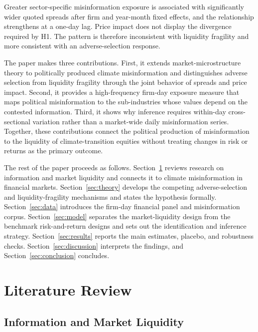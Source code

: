 \documentclass{article}
\theoremstyle{plain}
\begin{document}
Greater sector-specific misinformation exposure is associated with significantly wider quoted spreads after firm and year-month fixed effects, and the relationship strengthens at a one-day lag. Price impact does not display the divergence required by H1. The pattern is therefore inconsistent with liquidity fragility and more consistent with an adverse-selection response.

The paper makes three contributions. First, it extends market-microstructure theory to politically produced climate misinformation and distinguishes adverse selection from liquidity fragility through the joint behavior of spreads and price impact. Second, it provides a high-frequency firm-day exposure measure that maps political misinformation to the sub-industries whose values depend on the contested information. Third, it shows why inference requires within-day cross-sectional variation rather than a market-wide daily misinformation series. Together, these contributions connect the political production of misinformation to the liquidity of climate-transition equities without treating changes in risk or returns as the primary outcome.

The rest of the paper proceeds as follows. Section~\ref{sec:lit_review} reviews research on information and market liquidity and connects it to climate misinformation in financial markets. Section~\ref{sec:theory} develops the competing adverse-selection and liquidity-fragility mechanisms and states the hypothesis formally. Section~\ref{sec:data} introduces the firm-day financial panel and misinformation corpus. Section~\ref{sec:model} separates the market-liquidity design from the benchmark risk-and-return designs and sets out the identification and inference strategy. Section~\ref{sec:results} reports the main estimates, placebo, and robustness checks. Section~\ref{sec:discussion} interprets the findings, and Section~\ref{sec:conclusion} concludes.

\section{Literature Review}
\label{sec:lit_review}

\subsection{Information and Market Liquidity}
\end{document}
